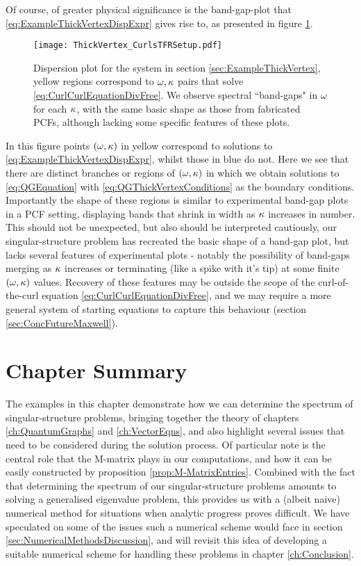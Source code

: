 Of course, of greater physical significance is the band-gap-plot that \eqref{eq:ExampleThickVertexDispExpr} gives rise to, as presented in figure \ref{fig:ThickVertex_CurlsTFRSetup}.
\begin{figure}[b!]
	\centering
	\texttt{[image: ThickVertex\_CurlsTFRSetup.pdf]}
	\caption{\label{fig:ThickVertex_CurlsTFRSetup} Dispersion plot for the system in section \ref{sec:ExampleThickVertex}, yellow regions correspond to $\omega, \kappa$ pairs that solve \eqref{eq:CurlCurlEquationDivFree}. We observe spectral ``band-gaps" in $\omega$ for each $\kappa$, with the same basic shape as those from fabricated PCFs, although lacking some specific features of these plots.}
\end{figure}
In this figure points $\left( \omega, \kappa \right)$ in yellow correspond to solutions to \eqref{eq:ExampleThickVertexDispExpr}, whilst those in blue do not.
Here we see that there are distinct branches or regions of $\left( \omega, \kappa \right)$ in which we obtain solutions to \eqref{eq:QGEquation} with \eqref{eq:QGThickVertexConditions} as the boundary conditions.
Importantly the shape of these regions is similar to experimental band-gap plots in a PCF setting, displaying bands that shrink in width as $\kappa$ increases in number.
This should not be unexpected, but also should be interpreted cautiously, our singular-structure problem has recreated the basic shape of a band-gap plot, but lacks several features of experimental plots - notably the possibility of band-gaps merging as $\kappa$ increases or terminating (like a spike with it's tip) at some finite $\left( \omega, \kappa \right)$ values.
Recovery of these features may be outside the scope of the curl-of-the-curl equation \eqref{eq:CurlCurlEquationDivFree}, and we may require a more general system of starting equations to capture this behaviour (section \ref{sec:ConcFutureMaxwell}).

\section{Chapter Summary} \label{sec:ExamplesSummary}
The examples in this chapter demonstrate how we can determine the spectrum of singular-structure problems, bringing together the theory of chapters \ref{ch:QuantumGraphs} and \ref{ch:VectorEqns}, and also highlight several issues that need to be considered during the solution process.
Of particular note is the central role that the M-matrix plays in our computations, and how it can be easily constructed by proposition \ref{prop:M-MatrixEntries}.
Combined with the fact that determining the spectrum of our singular-structure problems amounts to solving a generalised eigenvalue problem, this provides us with a (albeit naive) numerical method for situations when analytic progress proves difficult.
We have speculated on some of the issues such a numerical scheme would face in section \ref{sec:NumericalMethodsDiscussion}, and will revisit this idea of developing a suitable numerical scheme for handling these problems in chapter \ref{ch:Conclusion}. \newline

